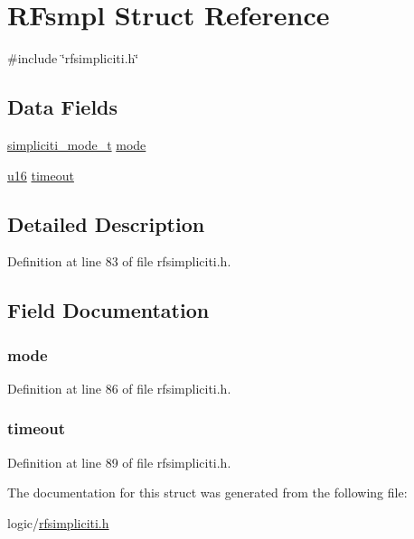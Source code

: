 \hypertarget{structRFsmpl}{\section{\-R\-Fsmpl \-Struct \-Reference}
\label{structRFsmpl}
}


{\ttfamily \#include \char`\"{}rfsimpliciti.\-h\char`\"{}}

\subsection*{\-Data \-Fields}
\begin{DoxyCompactItemize}
\item 
\hyperlink{rfsimpliciti_8h_a8f634dc8404e983a244ef648a1c38ece}{simpliciti\-\_\-mode\-\_\-t} \hyperlink{structRFsmpl_acd0291bcfc1da85956dd49b6b90e6ca3}{mode}
\item 
\hyperlink{main__ED__BM_8c_a9e6c91d77e24643b888dbd1a1a590054}{u16} \hyperlink{structRFsmpl_a735bf6536b07682f96c9417b0f1e9079}{timeout}
\end{DoxyCompactItemize}


\subsection{\-Detailed \-Description}


\-Definition at line 83 of file rfsimpliciti.\-h.



\subsection{\-Field \-Documentation}
\hypertarget{structRFsmpl_acd0291bcfc1da85956dd49b6b90e6ca3}{
\subsubsection[{mode}]{ {\bf mode}}}\label{structRFsmpl_acd0291bcfc1da85956dd49b6b90e6ca3}


\-Definition at line 86 of file rfsimpliciti.\-h.

\hypertarget{structRFsmpl_a735bf6536b07682f96c9417b0f1e9079}{
\subsubsection[{timeout}]{ {\bf timeout}}}\label{structRFsmpl_a735bf6536b07682f96c9417b0f1e9079}


\-Definition at line 89 of file rfsimpliciti.\-h.



\-The documentation for this struct was generated from the following file\-:\begin{DoxyCompactItemize}
\item 
logic/\hyperlink{rfsimpliciti_8h}{rfsimpliciti.\-h}\end{DoxyCompactItemize}
